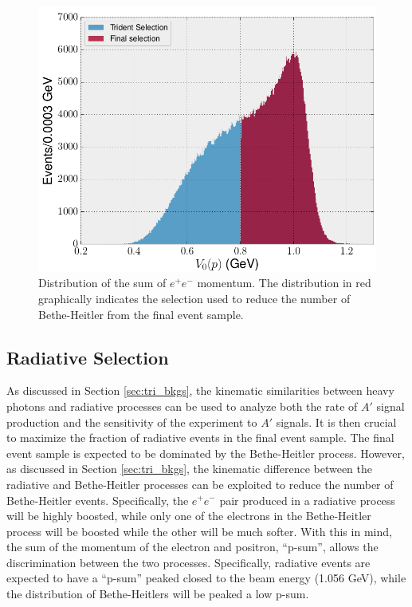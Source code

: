 \begin{figure}[ht]
    \centering
    \includegraphics[width=\textwidth]{images/20160504_psum.png}
    \caption{Distribution of the sum of $e^+e^-$ momentum.  The distribution in 
             red graphically indicates the selection used to reduce the number
             of Bethe-Heitler from the final event sample.}
    \label{fig:p_sum}
\end{figure}  

\subsection{Radiative Selection}

As discussed in Section \ref{sec:tri_bkgs}, the kinematic similarities between
heavy photons and
radiative processes can be used to analyze both the rate of $A'$ signal production
and the sensitivity of the experiment to $A'$ signals.  It is then crucial to
maximize the fraction of radiative events in the final event sample.  The final
event sample is expected to be dominated by the Bethe-Heitler process.  However,
as discussed in Section \ref{sec:tri_bkgs}, 
the kinematic difference between the radiative and Bethe-Heitler processes can 
be exploited to reduce the number of Bethe-Heitler events.  Specifically, the 
$e^+e^-$ pair produced in a radiative process will be highly boosted, while 
only one of the electrons in the Bethe-Heitler process will be boosted 
while the other will be much softer.  With this in mind, the sum of the momentum
of the electron and positron, ``p-sum'', allows the discrimination between the two processes.
Specifically, radiative events are expected to have a ``p-sum'' peaked 
closed to the beam energy (1.056 GeV), while the distribution of Bethe-Heitlers will be peaked a 
low p-sum.

